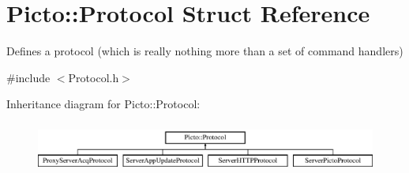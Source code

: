 \hypertarget{struct_picto_1_1_protocol}{\section{Picto\-:\-:Protocol Struct Reference}
\label{struct_picto_1_1_protocol}
}


Defines a protocol (which is really nothing more than a set of command handlers)  




{\ttfamily \#include $<$Protocol.\-h$>$}

Inheritance diagram for Picto\-:\-:Protocol\-:\begin{figure}[H]
\begin{center}
\leavevmode
\includegraphics[height=1.666667cm]{struct_picto_1_1_protocol}
\end{center}
\end{figure}
